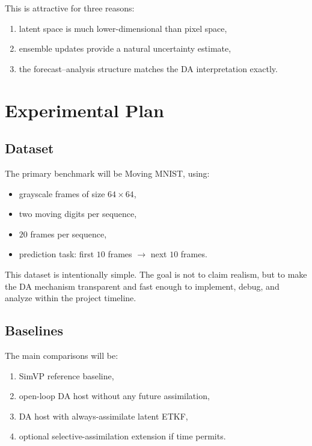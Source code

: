 \documentclass{article}
\begin{document}
This is attractive for three reasons:
\begin{enumerate}[leftmargin=1.2em]
    \item latent space is much lower-dimensional than pixel space,
    \item ensemble updates provide a natural uncertainty estimate,
    \item the forecast--analysis structure matches the DA interpretation exactly.
\end{enumerate}

\section{Experimental Plan}

\subsection{Dataset}

The primary benchmark will be Moving MNIST, using:
\begin{itemize}[leftmargin=1.2em]
    \item grayscale frames of size $64 \times 64$,
    \item two moving digits per sequence,
    \item $20$ frames per sequence,
    \item prediction task: first $10$ frames $\rightarrow$ next $10$ frames.
\end{itemize}

This dataset is intentionally simple. The goal is not to claim realism, but to make the DA mechanism transparent and fast enough to implement, debug, and analyze within the project timeline.

\subsection{Baselines}

The main comparisons will be:
\begin{enumerate}[leftmargin=1.2em]
    \item SimVP reference baseline,
    \item open-loop DA host without any future assimilation,
    \item DA host with always-assimilate latent ETKF,
    \item optional selective-assimilation extension if time permits.
\end{enumerate}
\end{document}
